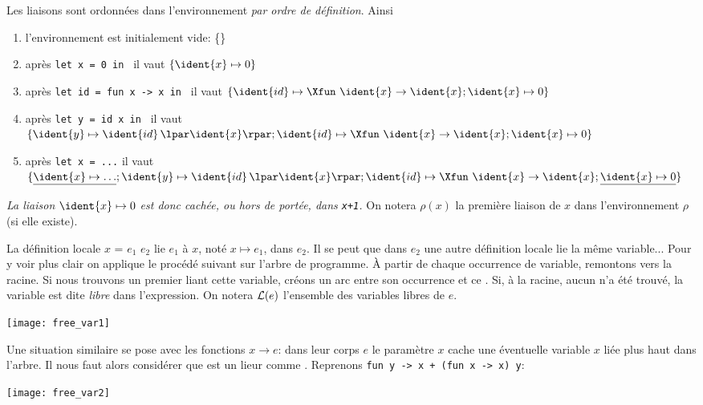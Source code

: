 Les liaisons sont ordonnées dans l'environnement \emph{par ordre de
définition}. Ainsi
\begin{enumerate}

  \item l'environnement est initialement vide: \{\}

  \item après {\small \verb|let x = 0 in |} il vaut $\{\ident{x} \mapsto
    0\}$

  \item après {\small \verb|let id = fun x -> x in |} il vaut
    $\{\ident{id} \mapsto \Xfun \,\, \ident{x} \rightarrow \ident{x}; 
     \ident{x} \mapsto 0\}$

  \item après {\small \verb|let y = id x in |} il vaut $\{\ident{y}
  \mapsto \ident{id} \, \lpar\ident{x}\rpar; \ident{id} \mapsto \Xfun \,\,
  \ident{x} \rightarrow \ident{x}; \ident{x} \mapsto 0\}$

  \item après {\small \verb|let x = ...|} il vaut    
    $\{\underline{\ident{x} \mapsto \ldots}; \ident{y} \mapsto \ident{id} \, \lpar\ident{x}\rpar;
   \ident{id} \mapsto \Xfun \,\, \ident{x} \rightarrow \ident{x};
   \underline{\ident{x} \mapsto 0}\}$

\end{enumerate}
\emph{La liaison $\ident{x} \mapsto 0$ est donc cachée, ou hors de portée, dans \texttt{x+1}.} On notera $\rho(x)$ la première liaison de $x$ dans l'environnement $\rho$ (si elle existe).


La définition locale \Xlet $x$ = $e_1$ \Xin $e_2$ lie $e_1$ à $x$, noté $x \mapsto e_1$, dans $e_2$. Il se peut que dans $e_2$ une autre définition locale lie la même variable... Pour y voir plus clair on applique le procédé suivant sur l'arbre de programme. À partir de chaque occurrence de variable, remontons vers la racine. Si nous trouvons un premier \Xlet liant cette variable, créons un arc entre son occurrence et ce \Xlet. Si, à la racine, aucun \Xlet n'a été trouvé, la variable est dite \emph{libre} dans l'expression. On notera ${\cal L} (e)$ l'ensemble des variables libres de $e$. 
\begin{center}
\texttt{[image: free\_var1]}
\end{center}

Une situation similaire se pose avec les fonctions \Xfun $x \rightarrow e$: dans leur corps $e$ le paramètre $x$ cache une éventuelle variable $x$ liée plus haut dans l'arbre. Il nous faut alors considérer que \Xfun est un lieur comme \Xlet. Reprenons \verb|fun y -> x + (fun x -> x) y|: \begin{center}
\texttt{[image: free\_var2]}
\end{center}

